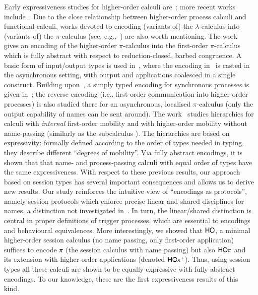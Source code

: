 Early expressiveness studies for higher-order calculi are~\cite{Tho90,San923}; 
more recent works include~\cite{BundgaardHG06,DBLP:conf/icalp/LanesePSS10,DBLP:journals/iandc/LanesePSS11,XuActa2012,DBLP:conf/wsfm/XuYL13}.
Due to the close relationship between higher-order process calculi and functional calculi, 
works devoted to encoding (variants of) the $\lambda$-calculus into (variants of) the $\pi$-calculus (see, e.g.,~\cite{San92,DBLP:journals/tcs/Fu99,DBLP:journals/iandc/YoshidaBH04,BHY,DBLP:conf/concur/SangiorgiX14}) are also worth mentioning.
The work~\cite{San923} gives an encoding of the higher-order $\pi$-calculus
into the first-order $\pi$-calculus which is fully abstract with respect to reduction-closed, barbed congruence. 
A basic form of input/output types is used in~\cite{DBLP:journals/tcs/Sangiorgi01}, where the encoding in~\cite{San923} is casted in the asynchronous setting, with output and applications coalesced in a single construct. Building upon~\cite{DBLP:journals/tcs/Sangiorgi01}, 
a simply typed encoding for synchronous processes is given in~\cite{SaWabook}; the reverse encoding (i.e.,  first-order communication into higher-order processes) is also studied there for an asynchronous, localised $\pi$-calculus (only the output capability of names can be sent around).
The work~\cite{San96int} studies hierarchies for calculi with \emph{internal} first-order mobility and 
with higher-order mobility without name-passing (similarly as the subcalculus \HO). 
The hierarchies are based on expressivity: 
formally defined according to the order of types needed in typing, 
they describe different ``degrees of mobility''.
Via fully abstract encodings, it is shown that that name- and process-passing calculi with equal order of types have the same expressiveness.
With respect to these previous results, our approach based on session types 
has several important consequences and allows us to derive new results.  Our study reinforces the intuitive view of ``encodings as protocols'', namely session protocols which enforce precise linear and shared disciplines for names, a distinction not investigated in~\cite{San923,DBLP:journals/tcs/Sangiorgi01}. 
In turn, the linear/shared distinction is central in proper definitions of trigger processes, which are essential to encodings and behavioural equivalences.
More interestingly, we showed that $\mathsf{HO}$, a  minimal higher-order session calculus (no name passing, only first-order application) suffices to encode $\pi$ (the session calculus with name passing) but also 
$\mathsf{HO}\pi$  and 
its extension  with higher-order applications (denoted $\mathsf{HO}\pi^{\mathsf +}$). 
Thus, using session types all these calculi are shown to be equally expressive with fully abstract encodings.
To our knowledge, these are the first expressiveness results of this kind.


